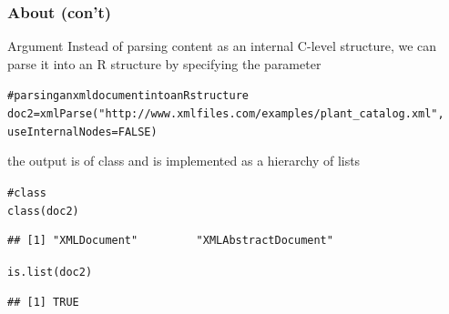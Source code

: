 \documentclass{beamer}\usepackage[]{graphicx}\usepackage[]{color}
\makeatletter
\newcommand{\hlnum}[1]{\textcolor[rgb]{0.063,0.58,0.627}{#1}}%
\newcommand{\hlstr}[1]{\textcolor[rgb]{0.063,0.58,0.627}{#1}}%
\newcommand{\hlcom}[1]{\textcolor[rgb]{0.588,0.588,0.588}{#1}}%
\newcommand{\hlstd}[1]{\textcolor[rgb]{0.196,0.196,0.196}{#1}}%
\newcommand{\hlkwb}[1]{\textcolor[rgb]{0.627,0,0.314}{#1}}%
\newcommand{\hlkwc}[1]{\textcolor[rgb]{0,0.631,0.314}{#1}}%
\newcommand{\hlkwd}[1]{\textcolor[rgb]{0.78,0.227,0.412}{#1}}%
\newenvironment{kframe}{%
 \def\at@end@of@kframe{}%
 \ifinner\ifhmode%
  \def\at@end@of@kframe{\end{minipage}}%
  \begin{minipage}{\columnwidth}%
 \fi\fi%
 \def\FrameCommand##1{\hskip\@totalleftmargin \hskip-\fboxsep
 \colorbox{shadecolor}{##1}\hskip-\fboxsep
     \hskip-\linewidth \hskip-\@totalleftmargin \hskip\columnwidth}%
 \MakeFramed {\advance\hsize-\width
   \@totalleftmargin\z@ \linewidth\hsize
   \@setminipage}}%
 {\par\unskip\endMakeFramed%
 \at@end@of@kframe}
\newenvironment{knitrout}{}{} %
\makeatother
\begin{document}
\begin{frame}[fragile]
\frametitle{About  (con't)}

\begin{block}{Argument }
Instead of parsing content as an internal C-level structure, we can parse it into an R structure by specifying the parameter 

\begin{knitrout}\tiny
{}\color{fgcolor}\begin{kframe}
\begin{alltt}
\hlcom{# parsing an xml document into an R structure}
\hlstd{doc2} \hlkwb{=} \hlkwd{xmlParse}\hlstd{(}\hlstr{"http://www.xmlfiles.com/examples/plant_catalog.xml"}\hlstd{,}
                \hlkwc{useInternalNodes} \hlstd{=} \hlnum{FALSE}\hlstd{)}
\end{alltt}
\end{kframe}
\end{knitrout}

the output is of class  and is implemented as a hierarchy of lists

\begin{knitrout}\tiny
{}\color{fgcolor}\begin{kframe}
\begin{alltt}
\hlcom{# class }
\hlkwd{class}\hlstd{(doc2)}
\end{alltt}
\begin{verbatim}
## [1] "XMLDocument"         "XMLAbstractDocument"
\end{verbatim}
\begin{alltt}
\hlkwd{is.list}\hlstd{(doc2)}
\end{alltt}
\begin{verbatim}
## [1] TRUE
\end{verbatim}
\end{kframe}
\end{knitrout}
\end{block}

\end{frame}

\end{document}
